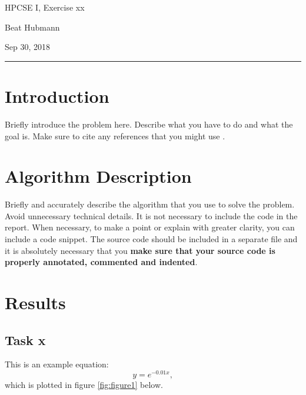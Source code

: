 \documentclass[11pt,a4paper]{article}
\begin{document}
\noindent\parbox{\linewidth}{
 \parbox{.25\linewidth}{ \large HPCSE I, Exercise xx }\hfill
 \parbox{.5\linewidth}{\begin{center} \large Beat Hubmann \end{center}}\hfill
 \parbox{.2\linewidth}{\begin{flushright} \large Sep 30, 2018 \end{flushright}}
}
\noindent\rule{\linewidth}{2pt}


\section{Introduction}

Briefly introduce the problem here. Describe what you have to do and what the goal is. Make sure to cite any references that you might use \cite{knuth}.

\section{Algorithm Description}

Briefly and accurately describe the algorithm that you use to solve the problem. Avoid unnecessary technical details. It is not necessary to include the code in the report. When necessary, to make a point or explain with greater clarity, you can include a code snippet. The source code should be included in a separate file and it is absolutely necessary that you \textbf{make sure that your source code is properly annotated, commented and indented}. 

\section{Results}

\subsection{Task x}
This is an example equation:
\begin{equation}
y = e^{-0.01x},
\end{equation}
which is plotted in figure \ref{fig:figure1} below.
\end{document}
